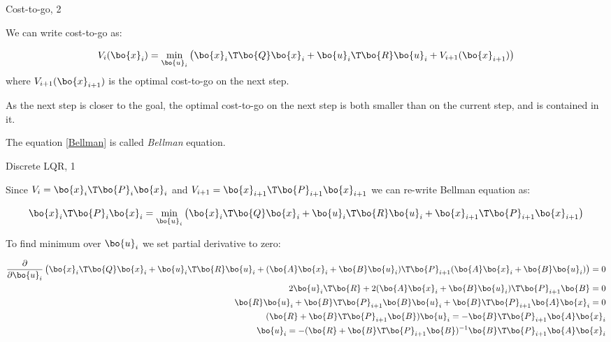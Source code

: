 \documentclass{beamer}
\begin{document}
\begin{frame}{Cost-to-go, 2}
	\begin{flushleft}
		
		We can write cost-to-go as:
		
		\begin{equation}
			\label{Bellman}
			V_i(\bo{x}_i) = \underset{\bo{u}_i}{\text{min}} 
						\left(
						\bo{x}_i\T \bo{Q} \bo{x}_i +  \bo{u}_i\T \bo{R} \bo{u}_i  + V_{i+1}(\bo{x}_{i+1})  
						\right)
		\end{equation}
		where $V_{i+1}(\bo{x}_{i+1})$ is the optimal cost-to-go on the next step. 
		
		\bigskip
		
		As the next step is closer to the goal, the optimal cost-to-go on the next step is both smaller than on the current step, and is contained in it.
		
		\bigskip
		
		The equation \eqref{Bellman} is called \emph{Bellman} equation.
		
	\end{flushleft}
\end{frame}



\begin{frame}{Discrete LQR, 1}
	\begin{flushleft}
		
		Since $V_i = \bo{x}_i\T \bo{P}_i \bo{x}_i$ and $V_{i+1} = \bo{x}_{i+1}\T \bo{P}_{i+1} \bo{x}_{i+1}$ we can re-write Bellman equation as:
		
		\begin{equation}
						\bo{x}_i\T \bo{P}_i \bo{x}_i = \underset{\bo{u}_i}{\text{min}} 
			\left(
			\bo{x}_i\T \bo{Q} \bo{x}_i +  \bo{u}_i\T \bo{R} \bo{u}_i  + \bo{x}_{i+1}\T \bo{P}_{i+1} \bo{x}_{i+1}
			 \right)
		\end{equation}
		
		To find minimum over $\bo{u}_i$ we set partial derivative to zero:
		
		\begin{align*}
			\frac{\partial}{\partial \bo{u}_i}
			\left( 
			\bo{x}_i \T \bo{Q} \bo{x}_i  +  \bo{u}_i\T \bo{R}\bo{u}_i + 
			(\bo{A}\bo{x}_i  + \bo{B}\bo{u}_i)\T \bo{P}_{i+1} (\bo{A}\bo{x}_i  + \bo{B}\bo{u}_i) 
			\right) = 0
			\\
			2\bo{u}_i\T \bo{R}  + 
			2(\bo{A}\bo{x}_i + \bo{B}\bo{u}_i)\T \bo{P}_{i+1} \bo{B} = 0
			\\
			\bo{R}\bo{u}_i + \bo{B}\T \bo{P}_{i+1} \bo{B} \bo{u}_i + \bo{B}\T \bo{P}_{i+1} \bo{A}\bo{x}_i  = 0
			\\
			(\bo{R} + \bo{B}\T \bo{P}_{i+1} \bo{B}) \bo{u}_i = -\bo{B}\T \bo{P}_{i+1} \bo{A}\bo{x}_i 
			\\
			\bo{u}_i = -(\bo{R} + \bo{B}\T \bo{P}_{i+1} \bo{B})^{-1} \bo{B}\T \bo{P}_{i+1} \bo{A}\bo{x}_i 
		\end{align*}

		
	\end{flushleft}
\end{frame}
\end{document}
